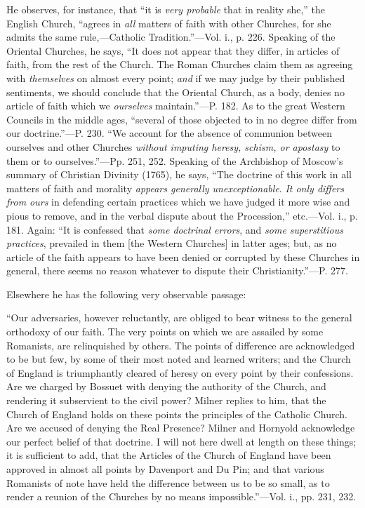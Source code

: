 He observes, for instance, that ``it is \emph{very
probable} that in reality she,'' the English Church, ``agrees in \emph{all}
matters of faith with other Churches, for she admits the same
rule,—Catholic Tradition.''—Vol. i., p. 226. Speaking of the
Oriental Churches, he says, ``It does not appear that they differ, in
articles of faith, from the rest of the Church. The Roman Churches
claim them as agreeing with \emph{themselves} on almost every point; \emph{and}
if we may judge by their published sentiments, we should conclude that
the Oriental Church, as a body, denies no article of faith which we \emph{ourselves}
maintain.''—P. 182. As to the great Western Councils in the middle
ages, ``several of those objected to in no degree differ from our
doctrine.''—P. 230. ``We account for the absence of communion between
ourselves and other Churches \emph{without imputing heresy, schism, or
apostasy} to them or to ourselves.''—Pp. 251, 252. Speaking of the
Archbishop of Moscow's summary of Christian Divinity (1765), he says, ``The
doctrine of this work in all matters of faith and morality \emph{appears
generally unexceptionable}. \emph{It only differs from ours} in
defending certain practices which we have judged it more wise and
pious to remove, and in the verbal dispute about the Procession,''
etc.—Vol. i., p. 181. Again: ``It is confessed that \emph{some doctrinal
errors}, and \emph{some superstitious practices}, prevailed in them
[the Western Churches] in latter ages; but, as no article of the faith
appears to have been denied or corrupted by these Churches in general,
there seems no reason whatever to dispute their Christianity.''—P.
277.

Elsewhere he has the following very observable
passage:

``Our
adversaries, however reluctantly, are obliged to bear witness to the
general orthodoxy of our faith. The very points on which we are
assailed by some Romanists, are relinquished by others. The points of
difference are acknowledged to be but few, by some of their most noted
and learned writers; and the Church of England is triumphantly cleared
of heresy on every point by their confessions. Are we charged by
Bossuet with denying the authority of the Church, and rendering it
subservient to the civil power? Milner replies to him, that the Church
of England holds on these points the principles of the Catholic
Church. Are we accused of denying the Real Presence? Milner and
Hornyold acknowledge our perfect belief of that doctrine. I will not
here dwell at length on these things; it is sufficient to add, that
the Articles of the Church of England have been approved in almost all
points by Davenport and Du Pin; and that various Romanists of note
have held the difference between us to be so small, as to render a
reunion of the Churches by no means impossible.''—Vol. i., pp. 231,
232.

